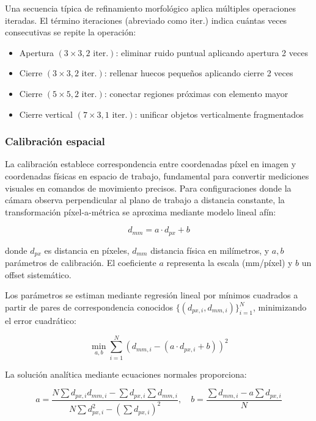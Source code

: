 Una secuencia típica de refinamiento morfológico aplica múltiples operaciones iteradas. El término iteraciones (abreviado como iter.) indica cuántas veces consecutivas se repite la operación:
\begin{itemize}[label=$\bullet$]
\item Apertura $(3 \times 3, 2 \text{ iter.})$: eliminar ruido puntual aplicando apertura 2 veces
\item Cierre $(3 \times 3, 2 \text{ iter.})$: rellenar huecos pequeños aplicando cierre 2 veces
\item Cierre $(5 \times 5, 2 \text{ iter.})$: conectar regiones próximas con elemento mayor
\item Cierre vertical $(7 \times 3, 1 \text{ iter.})$: unificar objetos verticalmente fragmentados
\end{itemize}

\subsubsection{Calibración espacial}

La calibración establece correspondencia entre coordenadas píxel en imagen y coordenadas físicas en espacio de trabajo, fundamental para convertir mediciones visuales en comandos de movimiento precisos. Para configuraciones donde la cámara observa perpendicular al plano de trabajo a distancia constante, la transformación píxel-a-métrica se aproxima mediante modelo lineal afín:

\begin{equation}
d_{mm} = a \cdot d_{px} + b
\end{equation}

donde $d_{px}$ es distancia en píxeles, $d_{mm}$ distancia física en milímetros, y $a, b$ parámetros de calibración. El coeficiente $a$ representa la escala (mm/píxel) y $b$ un offset sistemático.

Los parámetros se estiman mediante regresión lineal por mínimos cuadrados a partir de pares de correspondencia conocidos $\{(d_{px,i}, d_{mm,i})\}_{i=1}^{N}$, minimizando el error cuadrático:

\begin{equation}
\min_{a,b} \sum_{i=1}^{N} (d_{mm,i} - (a \cdot d_{px,i} + b))^2
\end{equation}

La solución analítica mediante ecuaciones normales proporciona:

\begin{equation}
a = \frac{N\sum d_{px,i}d_{mm,i} - \sum d_{px,i}\sum d_{mm,i}}{N\sum d_{px,i}^2 - (\sum d_{px,i})^2}, \quad b = \frac{\sum d_{mm,i} - a\sum d_{px,i}}{N}
\end{equation}

